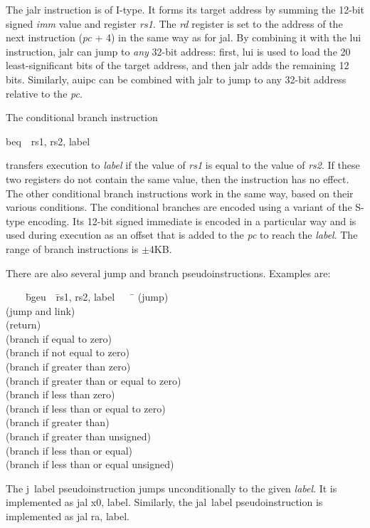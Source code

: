 \documentclass[11pt, twoside, pdftex]{article}
\newenvironment{ctabbing}%
{\begin{center}\begin{minipage}{\textwidth}\begin{tabbing}}
{\end{tabbing}\end{minipage}\end{center}}
\begin{document}
The {\sf jalr} instruction is of I-type. It forms its target address by summing the
12-bit signed {\it imm} value and register {\it rs1}. The {\it rd} register is set to the
address of the next instruction ({\it pc} + 4) in the same way as for {\sf jal}. 
By combining it with the {\sf lui} instruction, {\sf jalr} can jump to {\it any} 32-bit address:
first, {\sf lui} is used to load the 20 least-significant bits of the target address, and 
then {\sf jalr} adds the remaining 12 bits. Similarly, {\sf auipc} can be combined with
{\sf jalr} to jump to any 32-bit address relative to the {\it pc}. 

The conditional branch instruction
\vspace{-\baselineskip}
\begin{center}
{\sf beq~~rs1, rs2, label}
\end{center}
\noindent
transfers execution to {\it label} if the value of {\it rs1} is equal to the value of 
{\it rs2}. If these two registers do not contain the same value, then the instruction has
no effect. The other conditional branch instructions work in the same way, based on
their various conditions. The conditional branches are encoded using a variant of 
the S-type encoding. Its 12-bit signed immediate is encoded in a particular way and is used 
during execution as an offset that is added to the {\it pc} to reach the {\it label}.
The range of branch instructions is $\pm 4$KB.

There are also several jump and branch pseudoinstructions. Examples are:
\begin{ctabbing}
~~~~\={\sf bgeu}~~\={\sf rs1, rs2, label}~~~~\=\kill
{}  \>(jump)\\
  \>(jump and link)\\
 \>\>(return)\\
  \>(branch if equal to zero)\\
  \>(branch if not equal to zero)\\
  \>(branch if greater than zero)\\
  \>(branch if greater than or equal to zero)\\
  \>(branch if less than zero)\\
  \>(branch if less than or equal to zero)\\
  \>(branch if greater than)\\
  \>(branch if greater than unsigned)\\
  \>(branch if less than or equal)\\
  \>(branch if less than or equal unsigned)\\
\end{ctabbing}
\vspace{-\baselineskip}
The {\sf j~label} pseudoinstruction jumps unconditionally 
to the given {\it label}. It is implemented
as {\sf jal x0, label}. Similarly, the {\sf jal~label} pseudoinstruction is implemented as
{\sf jal ra, label}.
\end{document}

